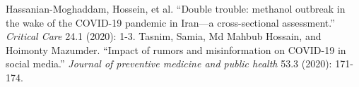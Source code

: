 \vspace{1cm}
\begin{thebibliography}{99}
     Hassanian-Moghaddam, Hossein, et al. ``Double trouble: methanol outbreak in the wake of the COVID-19 pandemic in Iran—a cross-sectional assessment.'' \textit{Critical Care} 24.1 (2020): 1-3.
     Tasnim, Samia, Md Mahbub Hossain, and Hoimonty Mazumder. ``Impact of rumors and misinformation on COVID-19 in social media.'' \textit{Journal of preventive medicine and public health} 53.3 (2020): 171-174.
\end{thebibliography}


